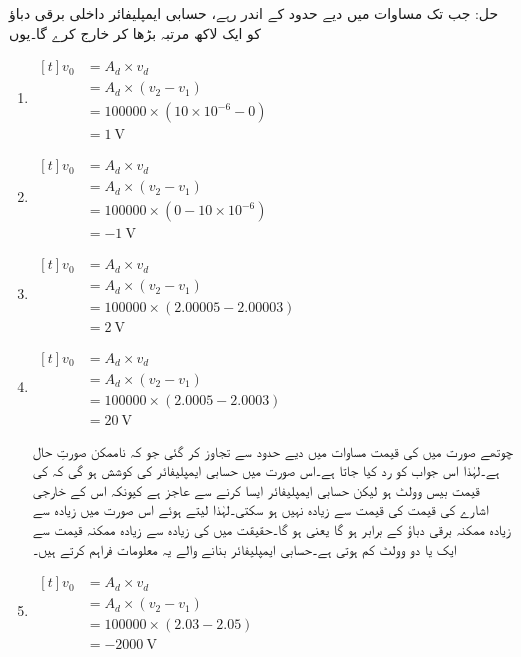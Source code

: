 حل:	جب تک  مساوات   میں دیے حدود کے اندر رہے، حسابی ایمپلیفائر داخلی برقی دباؤ کو ایک لاکھ مرتبہ بڑھا کر خارج کرے گا۔یوں
\begin{enumerate}
\item $\begin{aligned}[t]
v_0 &=A_d \times v_d \\
&=A_d \times \left (v_2 - v_1 \right )\\
&=100000 \times \left(10\times 10^{-6}-0 \right )\\
&=\SI{1}{\volt}
\end{aligned}$
%
\item $\begin{aligned}[t]
v_0 &=A_d \times v_d \\
&=A_d \times \left (v_2 - v_1 \right )\\
&=100000 \times \left(0-10\times 10^{-6} \right )\\
&=\SI{-1}{\volt}
\end{aligned}$
%
\item $\begin{aligned}[t]
v_0 &=A_d \times v_d \\
&=A_d \times \left (v_2 - v_1 \right )\\
&=100000 \times \left(2.00005-2.00003 \right )\\
&=\SI{2}{\volt}
\end{aligned}$

\item $\begin{aligned}[t]
v_0 &=A_d \times v_d \\
&=A_d \times \left (v_2 - v_1 \right )\\
&=100000 \times \left(2.0005-2.0003 \right )\\
&=\SI{20}{\volt}
\end{aligned}$

چوتھے صورت میں  کی قیمت مساوات  میں دیے حدود سے تجاوز کر گئی جو کہ ناممکن صورتِ حال ہے۔لہٰذا اس جواب کو رد کیا جاتا ہے۔اس صورت میں حسابی ایمپلیفائر کی کوشش ہو گی کہ  کی قیمت بیس وولٹ ہو لیکن حسابی ایمپلیفائر ایسا کرنے سے عاجز ہے  کیونکہ اس کے خارجی اشارے  کی قیمت  کی قیمت سے زیادہ نہیں ہو سکتی۔لہٰذا   لیتے ہوئے اس صورت میں  زیادہ سے زیادہ ممکنہ برقی دباؤ کے برابر ہو گا یعنی ہو گا۔حقیقت میں  کی زیادہ سے زیادہ ممکنہ قیمت  سے ایک یا دو وولٹ کم ہوتی ہے۔حسابی ایمپلیفائر بنانے والے یہ معلومات فراہم کرتے ہیں۔
\item $\begin{aligned}[t]
v_0 &=A_d \times v_d \\
&=A_d \times \left (v_2 - v_1 \right )\\
&=100000 \times \left(2.03-2.05 \right )\\
&=\SI{-2000}{\volt}
\end{aligned}$


\end{enumerate}
